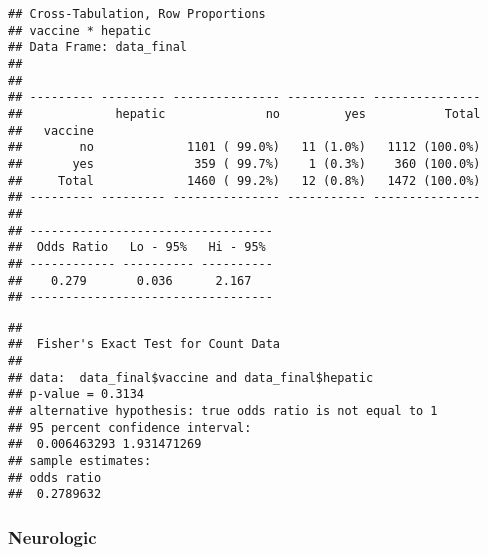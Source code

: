 \documentclass[
]{article}
\newenvironment{Shaded}{\begin{snugshade}}{\end{snugshade}}
\newcommand{\AttributeTok}[1]{\textcolor[rgb]{0.77,0.63,0.00}{#1}}
\newcommand{\ConstantTok}[1]{\textcolor[rgb]{0.00,0.00,0.00}{#1}}
\newcommand{\FunctionTok}[1]{\textcolor[rgb]{0.00,0.00,0.00}{#1}}
\newcommand{\NormalTok}[1]{#1}
\newcommand{\SpecialCharTok}[1]{\textcolor[rgb]{0.00,0.00,0.00}{#1}}
\newcommand{\StringTok}[1]{\textcolor[rgb]{0.31,0.60,0.02}{#1}}
\begin{document}
\begin{verbatim}
## Cross-Tabulation, Row Proportions  
## vaccine * hepatic  
## Data Frame: data_final  
## 
## 
## --------- --------- --------------- ----------- ---------------
##             hepatic              no         yes           Total
##   vaccine                                                      
##        no             1101 ( 99.0%)   11 (1.0%)   1112 (100.0%)
##       yes              359 ( 99.7%)    1 (0.3%)    360 (100.0%)
##     Total             1460 ( 99.2%)   12 (0.8%)   1472 (100.0%)
## --------- --------- --------------- ----------- ---------------
## 
## ----------------------------------
##  Odds Ratio   Lo - 95%   Hi - 95% 
## ------------ ---------- ----------
##    0.279       0.036      2.167   
## ----------------------------------
\end{verbatim}

\begin{Shaded}
\end{Shaded}

\begin{verbatim}
## 
##  Fisher's Exact Test for Count Data
## 
## data:  data_final$vaccine and data_final$hepatic
## p-value = 0.3134
## alternative hypothesis: true odds ratio is not equal to 1
## 95 percent confidence interval:
##  0.006463293 1.931471269
## sample estimates:
## odds ratio 
##  0.2789632
\end{verbatim}

\hypertarget{neurologic}{%
\subsubsection{Neurologic}\label{neurologic}}

\begin{Shaded}
\end{Shaded}
\end{document}

